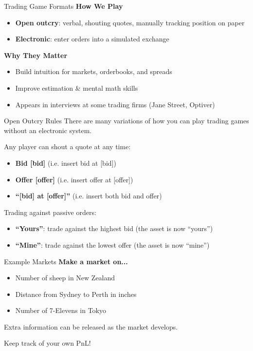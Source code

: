 \begin{frame}{Trading Game Formats}
  \textbf{How We Play}
  \begin{itemize}
    \item \textbf{Open outcry}: verbal, shouting quotes, manually tracking position on paper
    \item \textbf{Electronic}: enter orders into a simulated exchange
  \end{itemize}

  \vspace{0.3cm}
  \textbf{Why They Matter}
  \begin{itemize}
    \item Build intuition for markets, orderbooks, and spreads
    \item Improve estimation \& mental math skills
    \item Appears in interviews at some trading firms (Jane Street, Optiver)
  \end{itemize}
\end{frame}

\begin{frame}{Open Outcry Rules}
  There are many variations of how you can play trading games without an electronic system.

  Any player can shout a quote at any time:
  \begin{itemize}
    \item \textbf{Bid [bid]} (i.e. insert bid at [bid])
    \item \textbf{Offer [offer]} (i.e. insert offer at [offer])
    \item \textbf{``[bid] at [offer]''} (i.e. insert both bid and offer)
  \end{itemize}

  \vspace{0.3cm}
  Trading against passive orders:
  \begin{itemize}
    \item \textbf{``Yours''}: trade against the highest bid (the asset is now ``yours'')
    \item \textbf{``Mine''}: trade against the lowest offer (the asset is now ``mine'')
  \end{itemize}
\end{frame}

\begin{frame}{Example Markets}
  \textbf{Make a market on...}
  \begin{itemize}
    \item Number of sheep in New Zealand
    \item Distance from Sydney to Perth in inches
    \item Number of 7-Elevens in Tokyo
  \end{itemize}

  \vspace{0.3cm}
  Extra information can be released as the market develops.

  \vspace{0.3cm}
  \textcolor{sqt-question}{Keep track of your own PnL!}
\end{frame}

